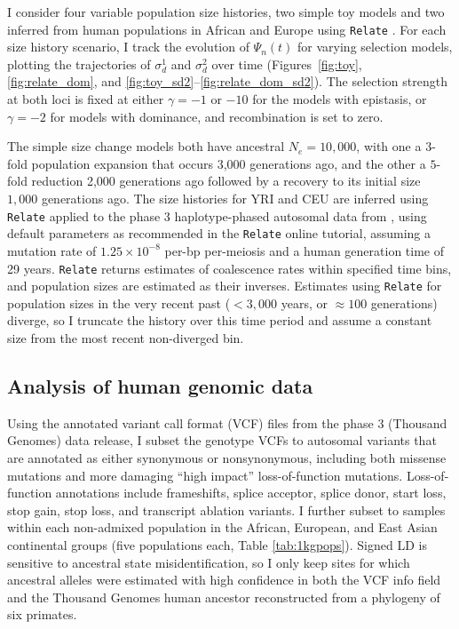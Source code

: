 \documentclass[]{article}
\begin{document}
I consider four variable population size histories, two simple toy models and
two inferred from human populations in African and Europe using \texttt{Relate}
\citep{Speidel2019-nj}. For each size history scenario, I track the evolution
of \(\Psi_n(t)\) for varying selection models, plotting the trajectories of
\(\sigma_d^1\) and \(\sigma_d^2\) over time (Figures~\ref{fig:toy},
\ref{fig:relate_dom}, and \ref{fig:toy_sd2}--\ref{fig:relate_dom_sd2}). The
selection strength at both loci is fixed at either \(\gamma=-1\) or \(-10\)
for the models with epistasis, or \(\gamma=-2\) for models with dominance, and
recombination is set to zero.

The simple size change models both have ancestral \(N_e=10,000\), with one a
\(3\)-fold population expansion that occurs 3,000 generations ago, and the
other a \(5\)-fold reduction 2,000 generations ago followed by a recovery to
its initial size \(1,000\) generations ago. The size histories for YRI and CEU
are inferred using \texttt{Relate} \citep{Speidel2019-nj} applied to the phase
3 haplotype-phased autosomal data from
\citet{1000_Genomes_Project_Consortium2015-zq}, using default parameters as
recommended in the \texttt{Relate} online tutorial, assuming a mutation rate of
\(1.25\times10^{-8}\) per-bp per-meiosis and a human generation time of 29
years. \texttt{Relate} returns estimates of coalescence rates within specified
time bins, and population sizes are estimated as their inverses. Estimates
using \texttt{Relate} for population sizes in the very recent past (\(<3,000\)
years, or \(\approx 100\) generations) diverge, so I truncate the history
over this time period and assume a constant size from the most recent
non-diverged bin.

\subsection{Analysis of human genomic data}
\label{analysis-of-human-genomic-data}

Using the annotated variant call format (VCF) files from the phase 3
\citet{1000_Genomes_Project_Consortium2015-zq} (Thousand Genomes) data release,
I subset the genotype VCFs to autosomal variants that are annotated as either
synonymous or nonsynonymous, including both missense mutations and more
damaging ``high impact'' loss-of-function mutations. Loss-of-function
annotations include frameshifts, splice acceptor, splice donor, start loss,
stop gain, stop loss, and transcript ablation variants. I further subset to
samples within each non-admixed population in the African, European, and East
Asian continental groups (five populations each, Table \ref{tab:1kgpops}).
Signed LD is sensitive to ancestral state misidentification, so I only keep
sites for which ancestral alleles were estimated with high confidence in both
the VCF info field and the Thousand Genomes human ancestor reconstructed from a
phylogeny of six primates.
\end{document}
